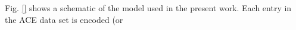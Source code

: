 Fig. \ref{} shows a schematic of the model used in the present work. Each entry in the ACE data set is encoded (or 
